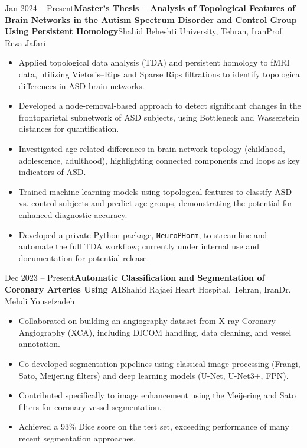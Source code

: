 \documentclass[12pt, b4paper]{cv}
\begin{document}
\begin{research_exp}{Jan 2024 -- Present}{\textbf{Master’s Thesis – Analysis of Topological Features of Brain Networks in the Autism Spectrum Disorder and Control Group Using Persistent Homology}\vspace{5pt}}{Shahid Beheshti University, Tehran, Iran}{Prof. Reza Jafari}

\vspace{10pt}
\begin{itemize}
	\item Applied topological data analysis (TDA) and persistent homology to fMRI data, utilizing Vietoris–Rips and Sparse Rips filtrations to identify topological differences in ASD brain networks.

	\item Developed a node-removal-based approach to detect significant changes in the frontoparietal subnetwork of ASD subjects, using Bottleneck and Wasserstein distances for quantification.
	
	\item Investigated age-related differences in brain network topology (childhood, adolescence, adulthood), highlighting connected components and loops as key indicators of ASD.
	
	\item Trained machine learning models using topological features to classify ASD vs. control subjects and predict age groups, demonstrating the potential for enhanced diagnostic accuracy.
	
	\item Developed a private Python package, \texttt{NeuroPHorm}, to streamline and automate the full TDA workflow; currently under internal use and documentation for potential release.
\end{itemize}
\end{research_exp}


\begin{research_exp}{Dec 2023 -- Present}{\textbf{Automatic Classification and Segmentation of Coronary Arteries Using AI}}{Shahid Rajaei Heart Hospital, Tehran, Iran}{Dr. Mehdi Yousefzadeh}
\vspace{10pt}
	\begin{itemize}
		\item Collaborated on building an angiography dataset from X-ray Coronary Angiography (XCA), including DICOM handling, data cleaning, and vessel annotation.

		\item Co-developed segmentation pipelines using classical image processing (Frangi, Sato, Meijering filters) and deep learning models (U-Net, U-Net3+, FPN).

		\item Contributed specifically to image enhancement using the Meijering and Sato filters for coronary vessel segmentation.

		\item Achieved a 93\% Dice score on the test set, exceeding performance of many recent segmentation approaches.
	\end{itemize}
	
\end{research_exp}
\end{document}
